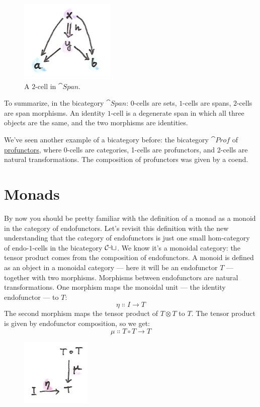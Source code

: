 \begin{figure}[H]
\centering
\includegraphics[width=0.4\textwidth]{images/morphspan.png}
\caption{A $2$-cell in $\cat{Span}$.}
\end{figure}

\noindent
To summarize, in the bicategory $\cat{Span}$: $0$-cells are sets, $1$-cells
are spans, $2$-cells are span morphisms. An identity $1$-cell is a
degenerate span in which all three objects are the same, and the two
morphisms are identities.

We've seen another example of a bicategory before: the bicategory
$\cat{Prof}$ of
\hyperref[ends-and-coends]{profunctors},
where 0-cells are categories, 1-cells are profunctors, and 2-cells are
natural transformations. The composition of profunctors was given by a
coend.

\section{Monads}

By now you should be pretty familiar with the definition of a monad as a
monoid in the category of endofunctors. Let's revisit this definition
with the new understanding that the category of endofunctors is just one
small hom-category of endo-$1$-cells in the bicategory $\mathcal{C\mkern-3mu at}$. We
know it's a monoidal category: the tensor product comes from the
composition of endofunctors. A monoid is defined as an object in a
monoidal category --- here it will be an endofunctor $T$ ---
together with two morphisms. Morphisms between endofunctors are natural
transformations. One morphism maps the monoidal unit --- the identity
endofunctor --- to $T$:
\[\eta \Colon I \to T\]
The second morphism maps the tensor product of $T \otimes T$ to
$T$. The tensor product is given by endofunctor composition, so
we get:
\[\mu \Colon T \circ T \to T\]

\begin{figure}[H]
\centering
\includegraphics[width=0.3\textwidth]{images/monad.png}
\end{figure}

